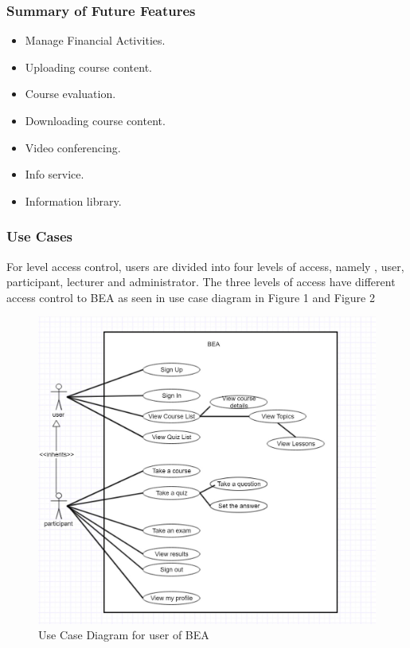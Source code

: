 \documentclass{scrartcl}
\begin{document}
  	\subsubsection{Summary of Future Features}
  	\begin{itemize}
  	\item Manage Financial Activities.
  	\item Uploading course content.
  	\item Course evaluation.
  	\item Downloading course content.
  	\item Video conferencing.
  	\item Info service.
  	\item Information library.
  	\end{itemize}
  	
  	
  	\subsubsection{Use Cases }
  	For level access control, users are divided into four levels of access, namely , user, participant, lecturer and administrator. The three levels of access have different access control to BEA  as seen in use case diagram in Figure 1  and Figure 2
  	\begin{figure}[H]
\centering
\includegraphics[width=150mm]{ucd_user.JPG}
\caption{Use Case Diagram for user of BEA}
\label{ucd_user}
\end{figure}
\end{document}
